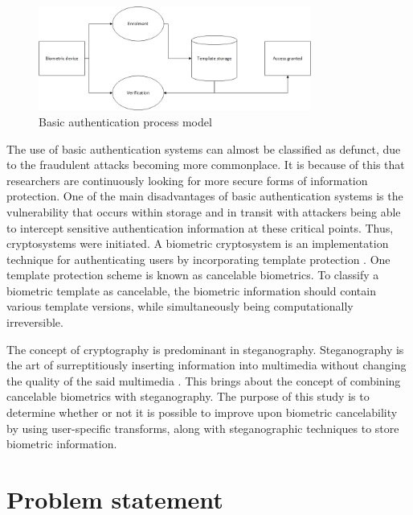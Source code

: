 \begin{figure}[hbtp]
\centering
\includegraphics[width=0.8\textwidth]{Chapter1/Figs/Figure1-1.png}
% 
\caption{ Basic authentication process model}
\label{fig:basic_authentication_process_model}
\end{figure}

The use of basic authentication systems can almost be classified as defunct, due to the fraudulent attacks becoming more commonplace. It is because of this that researchers are continuously looking for more secure forms of information protection. One of the main disadvantages of basic authentication systems is the vulnerability that occurs within storage and in transit with attackers being able to intercept sensitive authentication information at these critical points. Thus, cryptosystems were initiated. A biometric cryptosystem is an implementation technique for authenticating users by incorporating template protection \citep{Uludag2004}. One template protection scheme is known as cancelable biometrics. To classify a biometric template as cancelable, the biometric information should contain various template versions, while simultaneously being computationally irreversible. 

The concept of cryptography is predominant in steganography. Steganography is the art of surreptitiously inserting information into multimedia without changing the quality of the said multimedia \citep{Kishor2016}. This brings about the concept of combining cancelable biometrics with steganography.
The purpose of this study is to determine whether or not it is possible to improve upon biometric cancelability by using user-specific transforms, along with steganographic techniques to store biometric information.




\section{Problem statement} %


